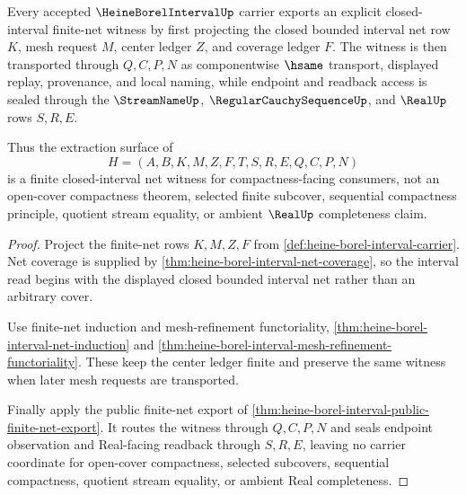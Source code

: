 \begin{theorem}
\label{thm:heine-borel-interval-closed-interval-net-extraction}
Every accepted $\HeineBorelIntervalUp$ carrier exports an explicit closed-interval finite-net witness by first projecting the closed bounded interval net row $K$, mesh request $M$, center ledger $Z$, and coverage ledger $F$. The witness is then transported through $Q,C,P,N$ as componentwise $\hsame$ transport, displayed replay, provenance, and local naming, while endpoint and readback access is sealed through the $\StreamNameUp$, $\RegularCauchySequenceUp$, and $\RealUp$ rows $S,R,E$.

Thus the extraction surface of
$$
H=(A,B,K,M,Z,F,T,S,R,E,Q,C,P,N)
$$
is a finite closed-interval net witness for compactness-facing consumers, not an open-cover compactness theorem, selected finite subcover, sequential compactness principle, quotient stream equality, or ambient $\RealUp$ completeness claim.
\end{theorem}
\begin{proof}
Project the finite-net rows $K,M,Z,F$ from \autoref{def:heine-borel-interval-carrier}. Net coverage is supplied by \autoref{thm:heine-borel-interval-net-coverage}, so the interval read begins with the displayed closed bounded interval net rather than an arbitrary cover.

Use finite-net induction and mesh-refinement functoriality, \autoref{thm:heine-borel-interval-net-induction} and \autoref{thm:heine-borel-interval-mesh-refinement-functoriality}. These keep the center ledger finite and preserve the same witness when later mesh requests are transported.

Finally apply the public finite-net export of \autoref{thm:heine-borel-interval-public-finite-net-export}. It routes the witness through $Q,C,P,N$ and seals endpoint observation and Real-facing readback through $S,R,E$, leaving no carrier coordinate for open-cover compactness, selected subcovers, sequential compactness, quotient stream equality, or ambient Real completeness.
\end{proof}

